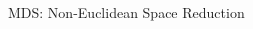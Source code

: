\documentclass{beamer}
\begin{document}
\begin{frame}{MDS: Non-Euclidean Space Reduction}
\begin{columns}
\begin{column}[T]{4cm}
\begin{center}
\end{center}
\end{column}
\end{columns}


\end{frame}
\end{document}
